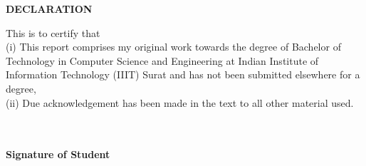 \thispagestyle{plain}
\normalsize

\begin{center}
{\Large {\bf \uppercase{Declaration}}}
\end{center}

\vspace{\baselineskip}
\justify
\indent
This is to certify that \\
\noindent(i) This report comprises my original work towards the degree of Bachelor of Technology in Computer Science and Engineering at Indian Institute of Information Technology (IIIT) Surat and has not been submitted elsewhere for a degree,  \\
\noindent(ii) Due acknowledgement has been made in the text to all other material used.

\justify

\begin{minipage}{\textwidth}
\begin{flushright} 


{\small \bf \textcolor{white}{}}\\
{\small \bf \textcolor{white}{}}\\
{\small \bf Signature of Student} \\
\end{flushright}
\end{minipage}
\newpage